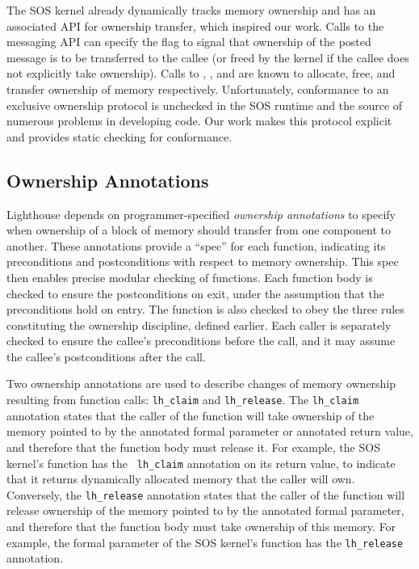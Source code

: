 The SOS kernel already dynamically tracks memory ownership and has an
associated API for ownership transfer, which inspired our work.  
%
Calls to the messaging API can specify the  flag to
signal that ownership of the posted message is to be transferred to the callee
(or freed by the kernel if the callee does not explicitly take ownership).  
%
Calls to , , and 
are known to allocate, free, and transfer ownership of memory respectively.
%
Unfortunately, conformance to an exclusive ownership protocol is unchecked in
the SOS runtime and the source of numerous problems in developing code.
%
Our work makes this protocol explicit and provides static checking for
conformance.



\subsection{Ownership Annotations}



Lighthouse depends on programmer-specified {\em ownership annotations} to
specify when ownership of a block of memory should transfer from one
component to another.
%
These annotations provide a ``spec'' for each function, indicating its
preconditions and postconditions with respect to memory ownership.  
%
This spec then enables precise modular checking of functions.  
%
Each function body is checked to ensure the postconditions on exit, under
the assumption that the preconditions hold on entry.  
%
The function is also checked to obey the three rules constituting the
ownership discipline, defined earlier.  
%
Each caller is separately checked to ensure the callee's preconditions
before the call, and it may assume the callee's postconditions after the
call.



Two ownership annotations are used to describe changes of memory ownership
resulting from function calls: {\tt lh\_claim} and {\tt lh\_release}.
%
The {\tt lh\_claim} annotation states that the caller of the function will
take ownership of the memory pointed to by the annotated formal parameter or
annotated return value, and therefore that the function body must release
it.
%
For example, the SOS kernel's  function has the {\tt
lh\_claim} annotation on its return value, to indicate that it returns
dynamically allocated memory that the caller will own.
%
Conversely, the {\tt lh\_release} annotation states that the caller of the
function will release ownership of the memory pointed to by the annotated
formal parameter, and therefore that the function body must take ownership
of this memory.
%
For example, the formal parameter of the SOS kernel's 
function has the {\tt lh\_release} annotation.



